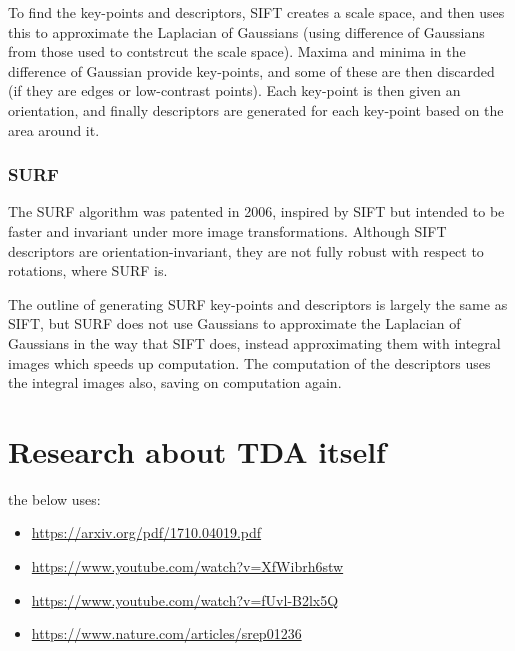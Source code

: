 \documentclass[a4paper]{article}
\begin{document}
To find the key-points and descriptors, SIFT creates a scale space, and then uses this to approximate the Laplacian of Gaussians (using difference of Gaussians from those used to contstrcut the scale space). Maxima and minima in the difference of Gaussian provide key-points, and some of these are then discarded (if they are edges or low-contrast points). Each key-point is then given an orientation, and finally descriptors are generated for each key-point based on the area around it.

\subsubsection*{SURF}
The SURF algorithm was patented in 2006, inspired by SIFT but intended to be faster and invariant under more image transformations. Although SIFT descriptors are orientation-invariant, they are not fully robust with respect to rotations, where SURF is.

The outline of generating SURF key-points and descriptors is largely the same as SIFT, but SURF does not use Gaussians to approximate the Laplacian of Gaussians in the way that SIFT does, instead approximating them with integral images which speeds up computation. The computation of the descriptors uses the integral images also, saving on computation again.

\section*{Research about TDA itself}
the below uses: 

\begin{itemize}
\item \url{https://arxiv.org/pdf/1710.04019.pdf}
\item \url{https://www.youtube.com/watch?v=XfWibrh6stw}
\item \url{https://www.youtube.com/watch?v=fUvl-B2lx5Q}
\item \url{https://www.nature.com/articles/srep01236}
\end{itemize}
\end{document}
